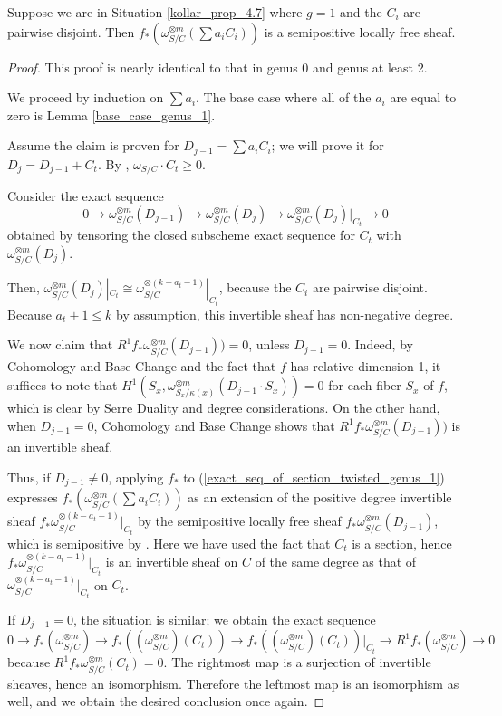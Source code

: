\begin{lemma}\label{inductive_step_genus_1}
Suppose we are in Situation \ref{kollar_prop_4.7} where $g=1$ and the $C_i$ are pairwise disjoint.
Then $f_{*}(\omega_{S/C}^{\otimes m}(\sum a_iC_i))$ is a semipositive locally free sheaf.
\end{lemma}
\begin{proof}
This proof is nearly identical to that in genus 0 and genus at least 2.

We proceed by induction on $\sum a_i$. 
The base case where all of the $a_i$ are equal to zero is Lemma \ref{base_case_genus_1}.

Assume the claim is proven for $D_{j-1}=\sum a_iC_i$; we will prove it for $D_{j}=D_{j-1}+C_t$.
By , $\omega_{S/C}\cdot C_t\ge0$.

Consider the exact sequence
\begin{equation}\label{exact_seq_of_section_twisted_genus_1}
0\to\omega_{S/C}^{\otimes m}(D_{j-1})\to\omega_{S/C}^{\otimes m}(D_j)\to \omega_{S/C}^{\otimes m}(D_j)|_{C_t}\to0
\end{equation}
obtained by tensoring the closed subscheme exact sequence for $C_t$ with $\omega_{S/C}^{\otimes m}(D_j)$.

Then, $\omega_{S/C}^{\otimes m}(D_j)|_{C_t}\cong \omega_{S/C}^{\otimes (k-a_{t}-1)}|_{C_t}$, because the $C_i$ are pairwise disjoint.
Because $a_{t}+1\le k$ by assumption, this invertible sheaf has non-negative degree.

We now claim that $R^{1}f_{*}\omega_{S/C}^{\otimes m}(D_{j-1}))=0$, unless $D_{j-1}=0$.
Indeed, by Cohomology and Base Change and the fact that $f$ has relative dimension 1, it suffices to note that $H^{1}(S_x,\omega_{S_x/\kappa(x)}^{\otimes m}(D_{j-1}\cdot S_x))=0$ for each fiber $S_x$ of $f$, which is clear by Serre Duality and degree considerations.
On the other hand, when $D_{j-1}=0$, Cohomology and Base Change shows that $R^{1}f_{*}\omega_{S/C}^{\otimes m}(D_{j-1}))$ is an invertible sheaf.


Thus, if $D_{j-1}\neq0$, applying $f_{*}$ to (\ref{exact_seq_of_section_twisted_genus_1}) expresses $f_{*}(\omega_{S/C}^{\otimes m}(\sum a_iC_i))$ as an extension of the positive degree invertible sheaf $f_{*}\omega_{S/C}^{\otimes (k-a_{t}-1)}|_{C_t}$ by the semipositive locally free sheaf $f_{*}\omega_{S/C}^{\otimes m}(D_{j-1})$, which is semipositive by .
Here we have used the fact that $C_t$ is a section, hence $f_{*}\omega_{S/C}^{\otimes (k-a_{t}-1)}|_{C_t}$ is an invertible sheaf on $C$ of the same degree as that of $\omega_{S/C}^{\otimes (k-a_{t}-1)}|_{C_t}$ on $C_t$.

If $D_{j-1}=0$, the situation is similar; we obtain the exact sequence
$$
0\to f_{*}(\omega_{S/C}^{\otimes m})\to f_{*}((\omega_{S/C}^{\otimes m})(C_t))\to f_{*}((\omega_{S/C}^{\otimes m})(C_t))|_{C_t}\to R^{1}f_{*}(\omega_{S/C}^{\otimes m})\to0
$$
because $R^{1}f_{*}\omega_{S/C}^{\otimes m}(C_t)=0$. 
The rightmost map is a surjection of invertible sheaves, hence an isomorphism.
Therefore the leftmost map is an isomorphism as well, and we obtain the desired conclusion once again.
\end{proof}




